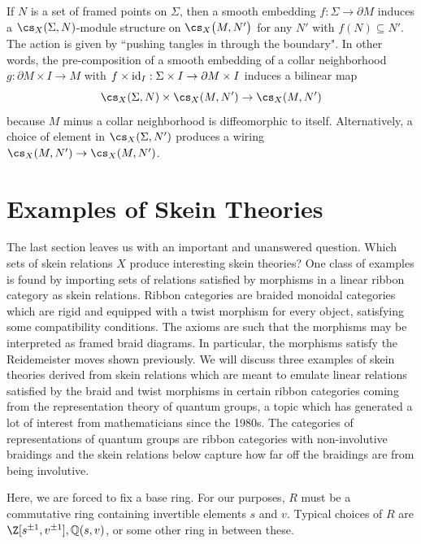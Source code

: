 \begin{remark} \label{rem:skeinaction}
If $N$ is a set of framed points on $\Sigma$, then a smooth embedding $f: \Sigma \to \partial M$ induces a $\cs_X(\Sigma, N)$-module structure on $\cs_X\big(M, N'\big)$ for any $N'$ with $f(N) \subseteq N'$. The action is given by ``pushing tangles in through the boundary". In other words, the pre-composition of a smooth embedding of a collar neighborhood $g: \partial M \times I \to M$ with $f \times {\rm{id}}_I: \Sigma\times I \to \partial M \times I$ induces a bilinear map
\[
\cs_X(\Sigma, N) \times \cs_X(M, N') \to \cs_X(M, N')
\]
because $M$ minus a collar neighborhood is diffeomorphic to itself. Alternatively, a choice of element in $\cs_X(\Sigma, N')$ produces a wiring $\cs_X(M, N') \to \cs_X(M, N')$.
\end{remark}


\section{Examples of Skein Theories} \label{sec:skeintheories}

The last section leaves us with an important and unanswered question. Which sets of skein relations $X$ produce interesting skein theories? One class of examples is found by importing sets of relations satisfied by morphisms in a linear ribbon category as skein relations. Ribbon categories are braided monoidal categories which are rigid and equipped with a twist morphism for every object, satisfying some compatibility conditions. The axioms are such that the morphisms may be interpreted as framed braid diagrams. In particular, the morphisms satisfy the Reidemeister moves shown previously. We will discuss three examples of skein theories derived from skein relations which are meant to emulate linear relations satisfied by the braid and twist morphisms in certain ribbon categories coming from the representation theory of quantum groups, a topic which has generated a lot of interest from mathematicians since the 1980s. The categories of representations of quantum groups are ribbon categories with non-involutive braidings and the skein relations below capture how far off the braidings are from being involutive.  

Here, we are forced to fix a base ring. For our purposes, $R$ must be a commutative ring containing invertible elements $s$ and $v$. Typical choices of $R$ are $\Z[s^{\pm 1}, v^{\pm 1}], \Q(s, v)$, or some other ring in between these. \\

